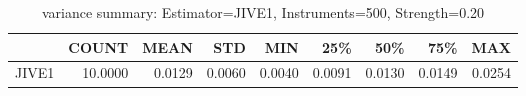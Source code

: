 \begin{table}[ht]
\centering
\caption{variance summary: Estimator=JIVE1, Instruments=500, Strength=0.20}
\begin{tabular}{lrrrrrrrr}
\toprule
 & COUNT & MEAN & STD & MIN & 25\% & 50\% & 75\% & MAX \\
\midrule
JIVE1 & 10.0000 & 0.0129 & 0.0060 & 0.0040 & 0.0091 & 0.0130 & 0.0149 & 0.0254 \\
\bottomrule
\end{tabular}
\end{table}
